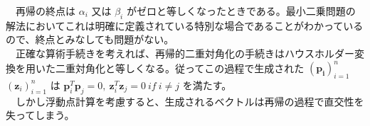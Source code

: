\documentclass[dvipdfmx,10pt,presentation]{beamer}
\begin{document}
\begin{frame}[label={sec:orge0fb956}]{}
　再帰の終点は \(\alpha_i\) 又は \(\beta_i\) がゼロと等しくなったときである。最小二乗問題の解法においてこれは明確に定義されている特別な場合であることがわかっているので、終点とみなしても問題がない。\\
　正確な算術手続きを考えれば、再帰的二重対角化の手続きはハウスホルダー変換を用いた二重対角化と等しくなる。従ってこの過程で生成された \((\bm{p_i})^n_{i=1}\) \((\bm{z}_i)^n_{i=1}\) は \(\bm{p}_i^T\bm{p}_j=0 ,\ \bm{z}_i^T\bm{z}_j=0\ if\ i\neq j\) を満たす。\\
　しかし浮動点計算を考慮すると、生成されるベクトルは再帰の過程で直交性を失ってしまう。\\
\end{frame}
\end{document}
